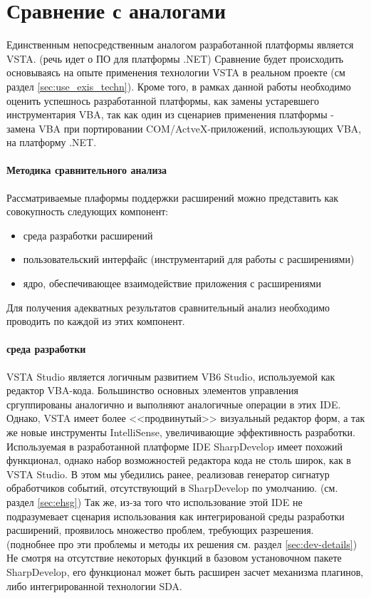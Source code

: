 \section{Сравнение с аналогами}

Единственным непосредственным аналогом разработанной платформы является VSTA. (речь идет о ПО для платформы .NET)  Сравнение будет происходить основываясь на опыте применения технологии VSTA в реальном проекте (см раздел \ref{sec:use_exis_techn}). Кроме того, в рамках данной работы необходимо оценить успешнось разработанной платформы, как замены устаревшего инструментария VBA, так как один из сценариев применения платформы - замена VBA при портировании COM/ActveX-приложений, использующих VBA, на платформу .NET.

\paragraph{Методика сравнительного анализа}

Рассматриваемые плаформы поддержки расширений можно представить как совокупность следующих компонент:

\begin{itemize}
   \item среда разработки расширений
   \item пользовательский интерфайс (инструментарий для работы с расширениями)
   \item ядро, обеспечивающее взаимодействие приложения с расширениями
\end{itemize}

Для получения адекватных результатов сравнительный анализ необходимо проводить по каждой из этих компонент.

\paragraph{среда разработки}

VSTA Studio является логичным развитием VB6 Studio, используемой как редактор VBA-кода. Большинство основных элементов управления сргуппированы аналогично и выполняют аналогичные операции в этих IDE. Однако, VSTA имеет более <<продвинутый>> визуальный редактор форм, а так же новые инструменты IntelliSense, увеличивающие эффективность разработки. Используемая в разработанной платформе IDE SharpDevelop имеет похожий функционал, однако набор возможностей редактора кода не столь широк, как в VSTA Studio. В этом мы убедились ранее, реализовав генератор сигнатур обработчиков событий, отсутствующий в SharpDevelop по умолчанию. (см. раздел \ref{sec:ehsg}) Так же, из-за того что использование этой IDE не подразумевает сценария использования как интегрированой среды разработки расширений, проявилось множество проблем, требующих разрешения. (поднобнее про эти проблемы и методы их решения см. раздел \ref{sec:dev-details}) Не смотря на отсутствие некоторых функций в базовом установочном пакете SharpDevelop, его функционал может быть расширен засчет механизма плагинов, либо интегрированной технологии SDA.

